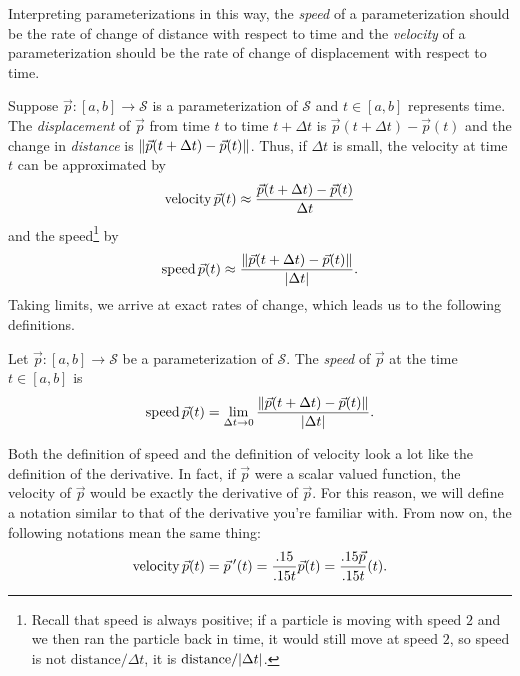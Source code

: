 Interpreting parameterizations in this way, the \emph{speed} of a parameterization
should be the rate of change of distance with respect to time and the \emph{velocity}
of a parameterization should be the rate of change of displacement with respect to time.

Suppose $\vec p:[a,b]\to\mathcal S$ is a parameterization of $\mathcal S$ and $t\in[a,b]$
represents time.  The \emph{displacement} of $\vec p$ from time $t$ to time $t+\Delta t$ is
$\vec p(t+\Delta t)-\vec p(t)$ and the change in \emph{distance} is $\lVert\vec p(t+\Delta t) - \vec p(t)\rVert$.
Thus, if $\Delta t$ is small, the velocity at time $t$ can be approximated by
\[
		\operatorname{velocity} \vec p(t) \approx \frac{\vec p(t+\Delta t) - \vec p(t)}{\Delta t}	
\]
and the speed\footnote{
		Recall that speed is always positive; if a particle is moving with speed $2$
		and we then ran the particle back in time, it would still move at speed $2$,
		so speed is not $\text{distance}/\Delta t$, it is $\text{distance}/\lvert\Delta t\rvert$.
		} by
\[
	\operatorname{speed} \vec p(t) \approx \frac{\lVert\vec p(t+\Delta t) - \vec p(t)\rVert}{\lvert\Delta t\rvert}.	
\]
Taking limits, we arrive at exact rates of change, which leads us to the following definitions.
\begin{definition}[Speed]
	Let $\vec p:[a,b]\to\mathcal S$ be a parameterization of $\mathcal S$.  The
	\emph{speed} of $\vec p$ at the time $t\in[a,b]$ is 
	\[
		\operatorname{speed} \vec p(t) = \lim_{\Delta t\to 0} \frac{\lVert\vec p(t+\Delta t) - \vec p(t)\rVert}{\lvert\Delta t\rvert}.	
	\]
\end{definition}
\DefVelocity

Both the definition of speed and the definition of velocity look a lot like the definition
of the derivative.  In fact, if $\vec p$ were a scalar valued function, the velocity of $\vec p$
would be exactly the derivative of $\vec p$.  For this reason, we will define a notation
similar to that of the derivative you're familiar with.  From now on, the following notations mean
the same thing:
\[
	\operatorname{velocity} \vec p(t) = \vec p\,'(t) = \frac{.15}{.15 t}\vec p(t) = \frac{.15 \vec p}{.15 t}(t).
\]

